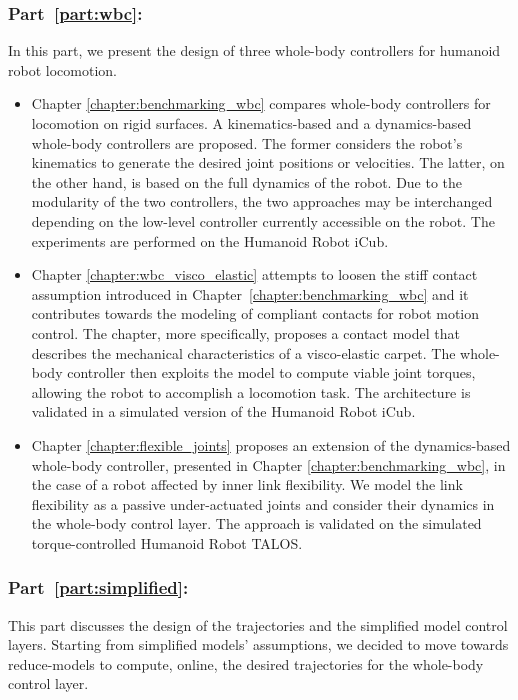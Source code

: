 \subsubsection*{Part~\ref{part:wbc}: }
In this part, we present the design of three whole-body controllers for humanoid robot
locomotion.
\begin{itemize}
    \item Chapter \ref{chapter:benchmarking_wbc} compares whole-body controllers for locomotion on rigid surfaces. A kinematics-based and a dynamics-based whole-body controllers are proposed. The former considers the robot's kinematics to generate the desired joint positions or velocities. The latter, on the other hand, is based on the full dynamics of the robot. Due to the modularity of the two controllers, the two approaches may be interchanged depending on the low-level controller currently accessible on the robot. The experiments are performed on the Humanoid Robot iCub.
    \item Chapter \ref{chapter:wbc_visco_elastic} attempts to loosen the stiff contact assumption introduced in Chapter~\ref{chapter:benchmarking_wbc} and it contributes towards the modeling of compliant contacts for robot motion control. The chapter, more specifically, proposes a contact model that describes the mechanical characteristics of a visco-elastic carpet. The whole-body controller then exploits the model to compute viable joint torques, allowing the robot to accomplish a locomotion task. The architecture is validated in a simulated version of the Humanoid Robot iCub.
    \item Chapter \ref{chapter:flexible_joints} proposes an extension of the dynamics-based whole-body controller, presented in Chapter \ref{chapter:benchmarking_wbc}, in the case of a robot affected by inner link flexibility. We model the link flexibility as a passive under-actuated joints and consider their dynamics in the whole-body control layer. The approach is validated on the simulated torque-controlled Humanoid Robot TALOS.
\end{itemize}


\subsubsection*{Part~\ref{part:simplified}: }

This part discusses the design of the trajectories and the simplified model control layers. Starting from simplified models' assumptions, we decided to move towards reduce-models to compute, online, the desired trajectories for the whole-body control layer.

